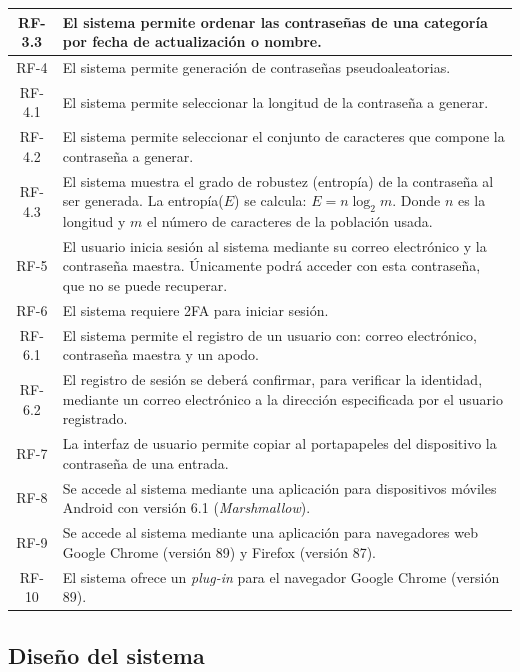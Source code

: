 \documentclass{article}
\begin{document}
\begin{table}[H]
\begin{tabular}{| c | p{30em} |}
       RF-3.3 & El sistema permite ordenar las contraseñas de una categoría por fecha de actualización o nombre. \\ \hline
       RF-4 & El sistema permite generación de contraseñas pseudoaleatorias. \\ \hline
       RF-4.1 & El sistema permite seleccionar la longitud de la contraseña a generar.\\ \hline
       RF-4.2 & El sistema permite seleccionar el conjunto de caracteres que compone la contraseña a generar.\\ \hline
       RF-4.3 & El sistema muestra el grado de robustez (entropía) de la contraseña al ser generada. La entropía($E$) se calcula: $E=n\log_2m$. Donde $n$ es la longitud y $m$ el número de caracteres de la población usada.\\ \hline
       RF-5 & El usuario inicia sesión al sistema mediante su correo electrónico y la contraseña maestra. Únicamente podrá acceder con esta contraseña, que no se puede recuperar.\\ \hline
       RF-6 & El sistema requiere 2FA para iniciar sesión. \\ \hline
       RF-6.1 & El sistema permite el registro de un usuario con: correo electrónico, contraseña maestra y un apodo.\\ \hline
       RF-6.2 & El registro de sesión se deberá confirmar, para verificar la identidad, mediante un correo electrónico a la dirección especificada por el usuario registrado. \\ \hline
       RF-7 & La interfaz de usuario permite copiar al portapapeles del dispositivo la contraseña de una entrada. \\ \hline
       RF-8 & Se accede al sistema mediante una aplicación para dispositivos móviles Android con versión 6.1 (\textit{Marshmallow}). \\ \hline
       RF-9 & Se accede al sistema mediante una aplicación para navegadores web Google Chrome (versión 89) y Firefox (versión 87). \\ \hline
       RF-10 & El sistema ofrece un \textit{plug-in} para el navegador Google Chrome (versión 89). \\ \hline
   \end{tabular}
\end{table}
 
\subsection{Diseño del sistema}
 
\end{document}
